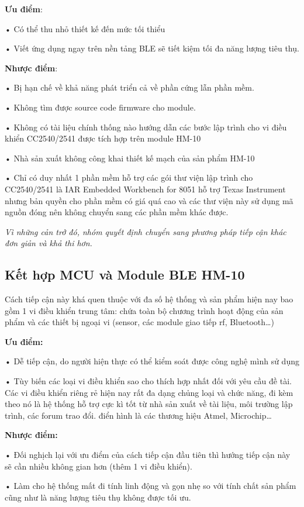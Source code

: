 \textbf{Ưu điểm}: 

• Có thể thu nhỏ thiết kế đến mức tối thiểu

• Viết ứng dụng ngay trên nền tảng BLE sẽ tiết kiệm tối đa năng lượng tiêu thụ.

\textbf{Nhược điểm}: 

• Bị hạn chế về khả năng phát triển cả về phần cứng lẫn phần mềm.

• Không tìm được source code firmware cho module.

• Không có tài liệu chính thống nào hướng dẫn các bước lập trình cho vi điều khiển CC2540/2541 được tích hợp trên module HM-10

• Nhà sản xuất không công khai thiết kế mạch của sản phẩm HM-10

• Chỉ có duy nhất 1 phần mềm hỗ trợ các gói thư viện lập trình cho CC2540/2541 là IAR Embedded Workbench for 8051 \cite{iar} hỗ trợ Texas Instrument nhưng bản quyền cho phần mềm có giá quá cao và các thư viện này sử dụng mã nguồn đóng nên không chuyển sang các phần mềm khác được.

\textit{Vì những cản trở đó, nhóm quyết định chuyển sang phương pháp tiếp cận khác đơn giản và khả thi hơn.}

\subsection{Kết hợp MCU và Module BLE HM-10}
Cách tiếp cận này khá quen thuộc với đa số hệ thống và sản phẩm hiện nay bao gồm 1 vi điều khiển trung tâm: chứa toàn bộ chương trình hoạt động của sản phẩm và các thiết bị ngoại vi (sensor, các module giao tiếp rf, Bluetooth…)

\textbf{Ưu điểm: }

• Dễ tiếp cận, do người hiện thực có thể kiểm soát được công nghệ mình sử dụng

• Tùy biến các loại vi điều khiển sao cho thích hợp nhất đối với yêu cầu đề tài. Các vi điều khiển riêng rẻ hiện nay rất đa dạng chủng loại và chức năng, đi kèm theo nó là hệ thống hỗ trợ cực kì tốt từ nhà sản xuất về tài liệu, môi trường lập trình, các forum trao đổi. điển hình là các thương hiệu Atmel, Microchip…

\textbf{Nhược điểm:} 

• Đối nghịch lại với ưu điểm của cách tiếp cận đầu tiên thì hướng tiếp cận này sẽ cần nhiều không gian hơn (thêm 1 vi điều khiển).

• Làm cho hệ thống mất đi tính linh động và gọn nhẹ so với tính chất sản phẩm cũng như là năng lượng tiêu thụ không được tối ưu.

